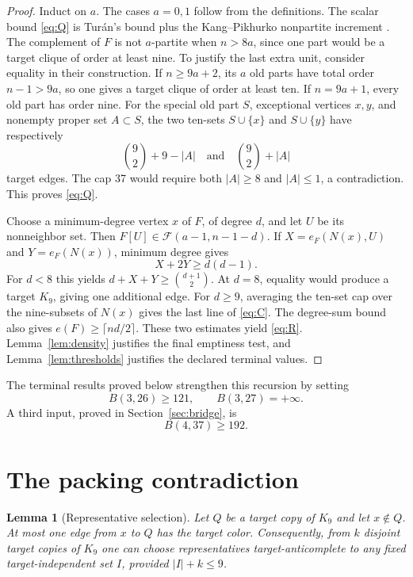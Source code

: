 \documentclass[11pt,reqno,a4paper]{amsart}
\newtheorem{lemma}[theorem]{Lemma}
\theoremstyle{definition}
\theoremstyle{remark}
\newcommand{\cF}{\mathcal F}
\newcommand{\emptycert}{+\infty}
\begin{document}
\begin{proof}
Induct on $a$. The cases $a=0,1$ follow from the definitions. The scalar
bound \eqref{eq:Q} is Tur\'an's bound plus the Kang--Pikhurko
nonpartite increment \cite{KangPikhurko2005}. The complement of $F$ is
not $a$-partite when $n>8a$, since one part would be a target clique of
order at least nine. To justify the last extra
unit, consider equality in their construction. If $n\ge9a+2$, its $a$
old parts have total order $n-1>9a$, so one gives a target clique of
order at least ten. If $n=9a+1$, every old part has order nine. For the
special old part $S$, exceptional vertices $x,y$, and nonempty proper
set $A\subset S$, the two ten-sets $S\cup\{x\}$ and $S\cup\{y\}$
have respectively
\[
 \binom92+9-|A|
 \quad\text{and}\quad
 \binom92+|A|
\]
target edges. The cap 37 would require both $|A|\ge8$ and
$|A|\le1$, a contradiction. This proves \eqref{eq:Q}.

Choose a minimum-degree vertex $x$ of $F$, of degree $d$, and let $U$
be its nonneighbor set. Then $F[U]\in\cF(a-1,n-1-d)$. If
$X=e_F(N(x),U)$ and $Y=e_F(N(x))$, minimum degree gives
\[
 X+2Y\ge d(d-1).
\]
For $d<8$ this yields
$d+X+Y\ge\binom{d+1}{2}$. At $d=8$, equality would produce a
target $K_9$, giving one additional edge. For $d\ge9$, averaging the
ten-set cap over the nine-subsets of $N(x)$ gives the last line of
\eqref{eq:C}. The degree-sum bound also gives
$e(F)\ge\lceil nd/2\rceil$. These two estimates yield
\eqref{eq:R}. Lemma~\ref{lem:density} justifies the final emptiness test,
and Lemma~\ref{lem:thresholds} justifies the declared terminal values.
\end{proof}

The terminal results proved below strengthen this recursion by setting
\begin{equation}\label{eq:terminal-inputs}
 B(3,26)\ge121,\qquad B(3,27)=\emptycert.
\end{equation}
A third input, proved in Section~\ref{sec:bridge}, is
\begin{equation}\label{eq:bridge-input}
 B(4,37)\ge192.
\end{equation}

\section{The packing contradiction}\label{sec:packing}

\begin{lemma}[Representative selection]\label{lem:representatives}
Let $Q$ be a target copy of $K_9$ and let $x\notin Q$. At most one
edge from $x$ to $Q$ has the target color. Consequently, from $k$
disjoint target copies of $K_9$ one can choose representatives
target-anticomplete to any fixed target-independent set $I$, provided
$|I|+k\le9$.
\end{lemma}
\end{document}
